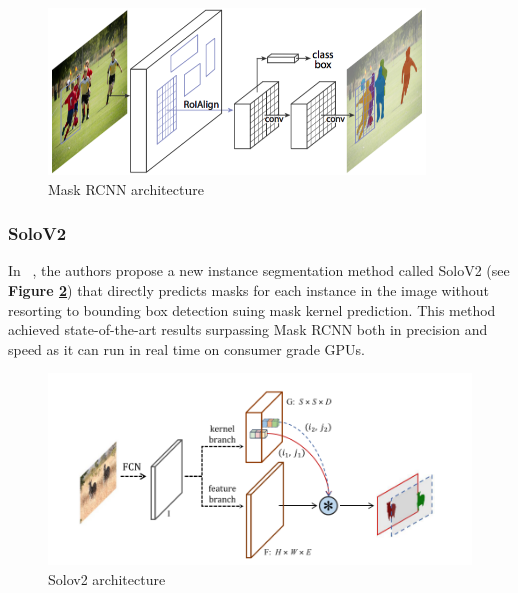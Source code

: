 \documentclass[main.tex]{subfiles}
\begin{document}
\begin{figure}[H]
    \centering
    \includegraphics[width=10cm]{images/mask-rcnn.png}
    \caption{Mask RCNN architecture}
    \label{fig:maskrcnn}
\end{figure}
\subsubsection{SoloV2}In ~\cite{Wang2020}, the authors propose a new instance segmentation method called SoloV2 (see \textbf{Figure \ref{fig:solo}}) that directly predicts masks for each instance in the image without resorting to bounding box detection suing mask kernel prediction. This method achieved state-of-the-art  results surpassing Mask RCNN both in precision and speed as it can run in real time on consumer grade GPUs.

\begin{figure}[H]
    \centering
    \includegraphics[width=12cm]{images/solov2.PNG}
    \caption{Solov2 architecture}
    \label{fig:solo}
\end{figure}
\end{document}

